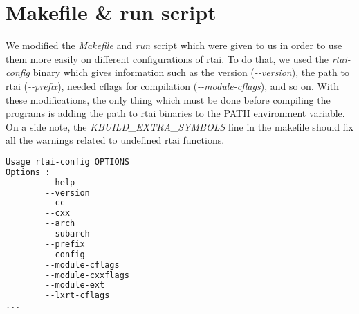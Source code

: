 \section{Makefile \& run script}

We modified the \emph{Makefile} and \emph{run} script which were given to us in order to use them more easily on different configurations of rtai. To do that, we used the \emph{rtai-config} binary which gives information such as the version (\emph{-{}-version}), the path to rtai (\emph{-{}-prefix}), needed cflags for compilation (\emph{-{}-module-cflags}), and so on. With these modifications, the only thing which must be done before compiling the programs is adding the path to rtai binaries to the PATH environment variable. On a side note, the \emph{KBUILD\_EXTRA\_SYMBOLS} line in the makefile should fix all the warnings related to undefined rtai functions.

\begin{lstlisting}[language=sh,caption={rtai-config help}]
Usage rtai-config OPTIONS
Options :
        --help
        --version
        --cc
        --cxx
        --arch
        --subarch
        --prefix
        --config
        --module-cflags
        --module-cxxflags
        --module-ext
        --lxrt-cflags
...
\end{lstlisting}



